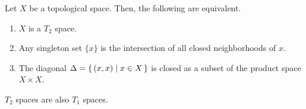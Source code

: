 %
\begin{thmbox}
    \begin{proposition}
        Let \(X\) be a {\color{mathif}topological space}. Then, the following are {\color{mathrem}equivalent}.
        \begin{enumerate}
            \item \(X\) is a {\color{maththen}\(T_2\) space}.
            \item Any singleton set \(\{x\}\) is the intersection of all closed neighborhoods of \(x\).
            \item The diagonal \(\Delta = \left\{\, (x, x) \mid x \in X \,\right\}\) is closed as a subset of the product space \(X \times X\).
        \end{enumerate}
    \end{proposition}
\end{thmbox}
%
\begin{thmbox}
    \begin{proposition}
        \(T_2\) spaces are also \(T_1\) spaces.
    \end{proposition}
\end{thmbox}